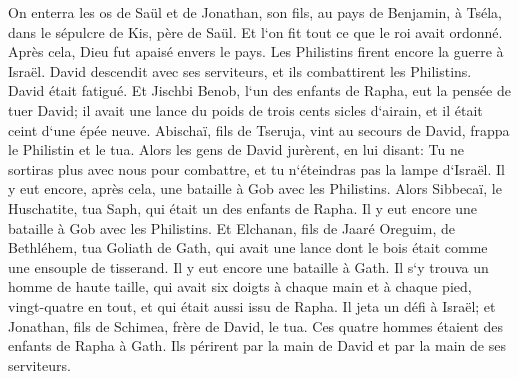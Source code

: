 \verse On enterra les os de Saül et de Jonathan, son fils, au pays de Benjamin, à Tséla, dans le sépulcre de Kis, père de Saül. Et l`on fit tout ce que le roi avait ordonné. Après cela, Dieu fut apaisé envers le pays. 
\verse Les Philistins firent encore la guerre à Israël. David descendit avec ses serviteurs, et ils combattirent les Philistins. David était fatigué. 
\verse Et Jischbi Benob, l`un des enfants de Rapha, eut la pensée de tuer David; il avait une lance du poids de trois cents sicles d`airain, et il était ceint d`une épée neuve. 
\verse Abischaï, fils de Tseruja, vint au secours de David, frappa le Philistin et le tua. Alors les gens de David jurèrent, en lui disant: Tu ne sortiras plus avec nous pour combattre, et tu n`éteindras pas la lampe d`Israël. 
\verse Il y eut encore, après cela, une bataille à Gob avec les Philistins. Alors Sibbecaï, le Huschatite, tua Saph, qui était un des enfants de Rapha. 
\verse Il y eut encore une bataille à Gob avec les Philistins. Et Elchanan, fils de Jaaré Oreguim, de Bethléhem, tua Goliath de Gath, qui avait une lance dont le bois était comme une ensouple de tisserand. 
\verse Il y eut encore une bataille à Gath. Il s`y trouva un homme de haute taille, qui avait six doigts à chaque main et à chaque pied, vingt-quatre en tout, et qui était aussi issu de Rapha. 
\verse Il jeta un défi à Israël; et Jonathan, fils de Schimea, frère de David, le tua. 
\verse Ces quatre hommes étaient des enfants de Rapha à Gath. Ils périrent par la main de David et par la main de ses serviteurs. 

\chapter{}

